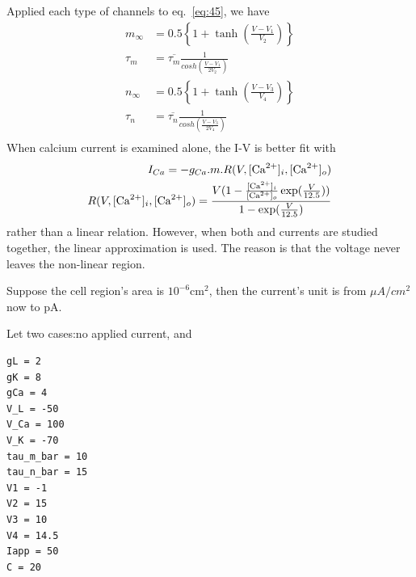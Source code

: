 Applied each type of channels to eq.~\eqref{eq:45}, we have
\begin{equation}
  \label{eq:55}
  \begin{split}
    m_\infty &= 0.5 \left\{1+\tanh(\frac{V-V_1}{V_2})
    \right\} \\
    \tau_m &= \overline{\tau_m}\frac{1}{cosh(\frac{V-V_1}{2V_2})} \\
    n_\infty &= 0.5 \left\{1+\tanh(\frac{V-V_3}{V_4})
    \right\} \\
    \tau_n &= \overline{\tau_n}\frac{1}{cosh(\frac{V-V_3}{2V_4})} \\
  \end{split}
\end{equation}
When calcium current is examined alone, the I-V is better fit with
\begin{equation}
  \label{eq:617}
  \begin{split}
    I_{Ca} = -{g_{Ca}} .m. R(V,[\ce{Ca^2+}]_i,[\ce{Ca^2+}]_o) \\
    R(V,[\ce{Ca^2+}]_i,[\ce{Ca^2+}]_o) = \frac{V(1-\frac{[\ce{Ca^2+}]_i}{[\ce{Ca^2+}]_o}\exp(\frac{V}{12.5}))}{1-\exp(\frac{V}{12.5})}
  \end{split}
\end{equation}
rather than a linear relation. However, when both  and
 currents are studied together, the linear approximation is
used. The reason is that the voltage never leaves the non-linear
region. 




Suppose the cell region's area is $10^{-6}$cm$^{2}$, then the
current's unit is from $\mu A/cm^2$ now to pA.

Let two cases:no applied current, and 
\begin{verbatim}
gL = 2
gK = 8
gCa = 4
V_L = -50
V_Ca = 100
V_K = -70
tau_m_bar = 10
tau_n_bar = 15
V1 = -1
V2 = 15
V3 = 10
V4 = 14.5
Iapp = 50
C = 20
\end{verbatim}

